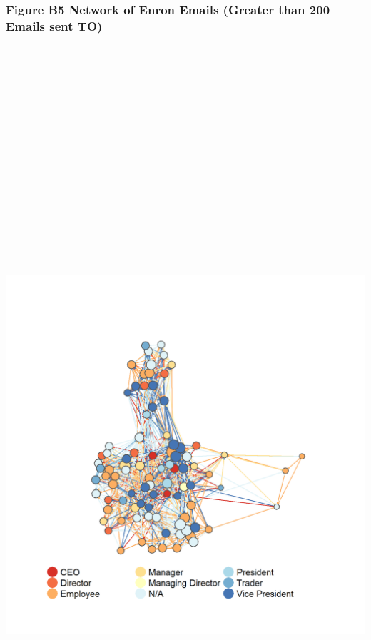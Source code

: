 \documentclass[]{article}
\begin{document}
\newpage

\subsubsection{Figure B5 Network of Enron Emails (Greater than 200
Emails sent
TO)}\label{figure-b5-network-of-enron-emails-greater-than-200-emails-sent-to}

\section{\texorpdfstring{\protect\includegraphics[height=12.50000in]{images/n_to_ge200.png}}{Network of Enron Emails}}\label{network-of-enron-emails-2}
\end{document}
